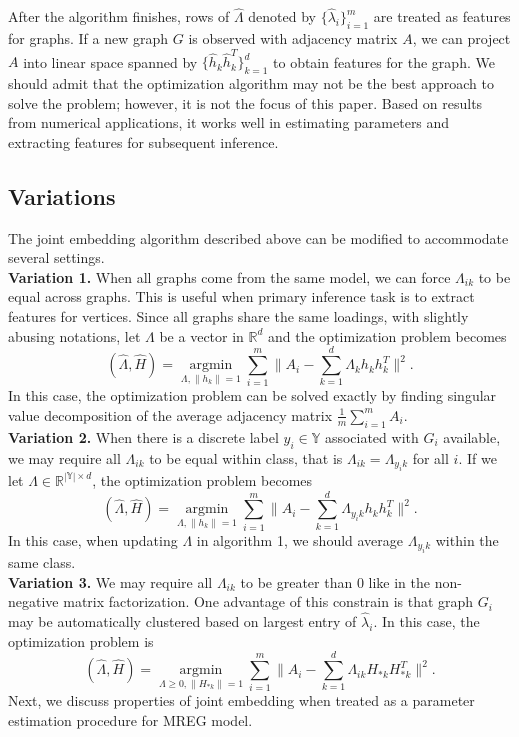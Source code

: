 \documentclass[10pt,journal,compsoc]{IEEEtran}
\begin{document}
\noindent After the algorithm finishes, rows of $\hat{\Lambda}$ denoted by $\{\hat{\lambda}_i\}_{i=1}^m$ are treated as features for graphs. If a new graph $G$ is observed with adjacency matrix $A$, we can project $A$ into linear space spanned by $\{\hat{h}_k \hat{h}_k^T\}_{k=1}^{d}$ to obtain features for the graph. We should admit that the optimization algorithm may not be the best approach to solve the problem; however, it is not the focus of this paper. Based on results from numerical applications, it works well in estimating parameters and extracting features for subsequent inference.



\subsection{Variations}
The joint embedding algorithm described above can be modified to accommodate several settings. \\
\textbf{Variation 1.} When all graphs come from the same model, we can force $\Lambda_{ik}$ to be equal across graphs. This is useful when primary inference task is to extract features for vertices. Since all graphs share the same loadings, with slightly abusing notations, let $\Lambda$ be a vector in $\mathbb{R}^d$ and the optimization problem becomes
\[ (\hat{\Lambda},\hat{H}) = \underset{\Lambda,\|h_k\|=1}{\operatorname{argmin}} \sum\limits_{i=1}^{m} \| A_i- \sum\limits_{k=1}^{d} \Lambda_{k} h_k h_k^T \|  ^2.  \] 
In this case, the optimization problem can be solved exactly by finding singular value decomposition of the average adjacency matrix $\frac{1}{m}\sum\limits_{i=1}^{m}A_i$. \\
\textbf{Variation 2.} When there is a discrete label $y_i \in \mathbb{Y}$ associated with $G_i$ available, we may require all $\Lambda_{ik}$ to be equal within class, that is $\Lambda_{ik}=\Lambda_{y_ik}$ for all $i$. If we let $\Lambda \in \mathbb{R}^{|\mathbb{Y}| \times d}$, the optimization problem becomes
\[ (\hat{\Lambda},\hat{H}) = \underset{\Lambda,\|h_k\|=1}{\operatorname{argmin}} \sum\limits_{i=1}^{m} \| A_i- \sum\limits_{k=1}^{d} \Lambda_{y_i k} h_k h_k ^T \|  ^2.  \] 
In this case, when updating $\Lambda$ in algorithm 1, we should average $\Lambda_{y_i k}$ within the same class. \\
\textbf{Variation 3.} We may require all $\Lambda_{ik}$ to be greater than $0$ like in the non-negative matrix factorization. One advantage of this constrain is that graph $G_i$ may be automatically clustered  based on largest entry of $\hat{\lambda}_{i}$. In this case, the optimization problem is
\[ (\hat{\Lambda},\hat{H}) = \underset{\Lambda \geq 0,\|H_{*k}\|=1}{\operatorname{argmin}} \sum\limits_{i=1}^{m} \| A_i- \sum\limits_{k=1}^{d} \Lambda_{ik} H_{*k} H_{*k}^T \|  ^2.  \] 
Next, we discuss properties of joint embedding when treated as a parameter estimation procedure for MREG model.
\end{document}
